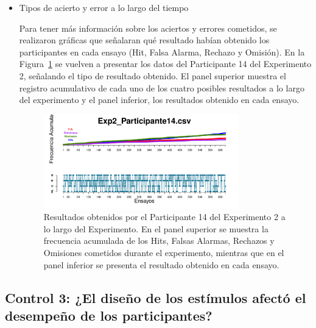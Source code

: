 \begin{itemize}


	\item Tipos de acierto y error a lo largo del tiempo

Para tener más información sobre los aciertos y errores cometidos, se realizaron gráficas que señalaran qué resultado habían obtenido los participantes en cada ensayo (Hit, Falsa Alarma, Rechazo y Omisión). En la Figura~\ref{fig:Outcome_E2_P14} se vuelven a presentar los datos del Participante 14 del Experimento 2, señalando el tipo de resultado obtenido. El panel superior muestra el registro acumulativo de cada uno de los cuatro posibles resultados a lo largo del experimento y el panel inferior, los resultados obtenido en cada ensayo.\\ 

\begin{figure}[th]
\centering
\includegraphics[width=0.80\textwidth]{Figures/Outcome_Exp2_P14}
\decoRule
\caption[Explorando datos individuales (ejemplo): Tipos de acierto y error obtenidos en cada ensayo]{Resultados obtenidos por el Participante 14 del Experimento 2 a lo largo del Experimento. En el panel superior se muestra la frecuencia acumulada de los Hits, Falsas Alarmas, Rechazos y Omisiones cometidos durante el experimento, mientras que en el panel inferior se presenta el resultado obtenido en cada ensayo.}
\label{fig:Outcome_E2_P14}
\end{figure}


\end{itemize}










\subsection{Control 3: ¿El diseño de los estímulos afectó el desempeño de los participantes?}

